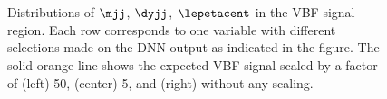 \begin{figure}[ht]
{        } \\
         \\
        {\caption[Distributions of $\mjj$, $\dyjj$, $\lepetacent$ in the VBF \TwoJet signal region.]{Distributions of $\mjj$, $\dyjj$, $\lepetacent$ in the VBF \TwoJet signal region.
            Each row corresponds to one variable with different selections made on the DNN output as indicated in the figure. The solid orange line shows the expected VBF signal scaled by a factor of (left) 50, (center) 5, and (right) without any scaling.
            \label{app:fig:dnn-inputs-vbf-top1} }}
    \end{figure}


